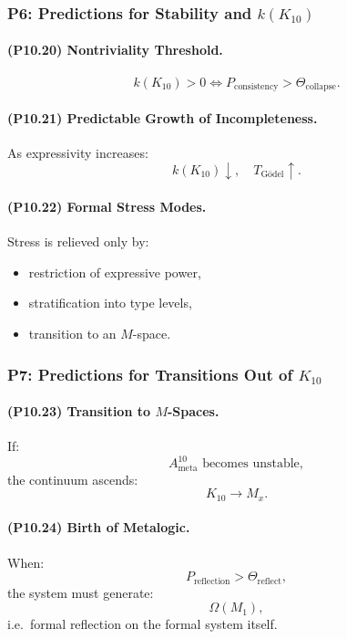 \subsubsection{P6: Predictions for Stability and $k(K_{10})$}

\paragraph{(P10.20) Nontriviality Threshold.}
\[
k(K_{10}) > 0
\iff
P_{\mathrm{consistency}} > \Theta_{\mathrm{collapse}}.
\]

\paragraph{(P10.21) Predictable Growth of Incompleteness.}
As expressivity increases:
\[
k(K_{10}) \downarrow,
\quad
T_{\mathrm{Gödel}} \uparrow.
\]

\paragraph{(P10.22) Formal Stress Modes.}
Stress is relieved only by:
\begin{itemize}
    \item restriction of expressive power,
    \item stratification into type levels,
    \item transition to an $M$-space.
\end{itemize}

\subsubsection{P7: Predictions for Transitions Out of $K_{10}$}

\paragraph{(P10.23) Transition to \texorpdfstring{$M$}{M}-Spaces.}
If:
\[
A_{\mathrm{meta}}^{10} \text{ becomes unstable},
\]
the continuum ascends:
\[
K_{10} \to M_x.
\]

\paragraph{(P10.24) Birth of Metalogic.}
When:
\[
P_{\mathrm{reflection}} > \Theta_{\mathrm{reflect}},
\]
the system must generate:
\[
\Omega(M_1),
\]
i.e.\ formal reflection on the formal system itself.


